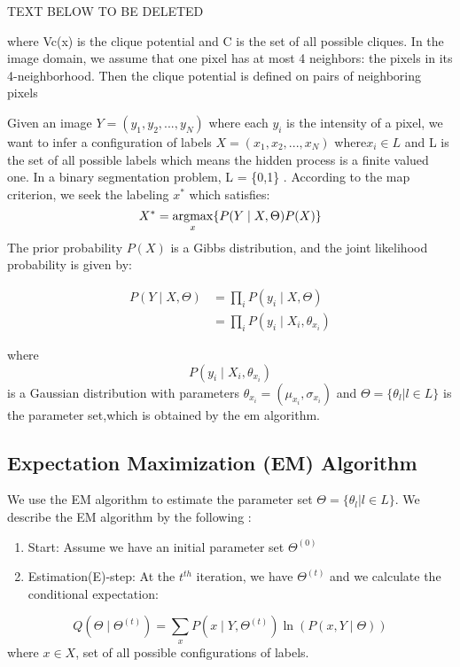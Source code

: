 TEXT BELOW TO BE DELETED

where Vc(x) is the clique potential and C is the set of all possible cliques. In the image domain, we assume that one pixel has at most 4 neighbors: the pixels in its 4-neighborhood. Then the clique potential is defined on pairs of neighboring pixels

Given an image \(Y=(y_1, y_2,..., y_N)\) where each \(y_i\) is the intensity of a pixel, we want to infer a configuration of labels \(X = (x_1,x_2,...,x_N)\) where\(x_i \in L\)  and L is the set of all possible labels which means the hidden process is a finite valued one\cite {monfrini2003image}. In a binary segmentation problem, L = \{0,1\} . According to the \gls{map} criterion, we seek the labeling \(x^*\) which satisfies:
\begin{equation}
X^*=\operatorname*{argmax}_x  \{ P( Y \mid X, \Theta)P(X)\} 
\end{equation}
The prior probability \(P(X)\) is a Gibbs distribution, and the joint likelihood probability is given by:

\begin{equation}\label{eq1}
\begin{split}
P( Y \mid X,\Theta) & =\prod_{i}^{ } P( y_i \mid X,\Theta)\\
& =\prod_{i}^{ }P( y_i \mid X_i,\theta_{x_i})
\end{split}
\end{equation}

where \[P( y_i \mid X_i,\theta_{x_i})\] is a Gaussian distribution with parameters
\(\theta_{x_i}=(\mu_{x_i} , \sigma_{x_i})\) and \(\Theta=\{\theta_l\lvert l \in L\}\)
is the parameter set,which is obtained by the \gls{em} algorithm.

\subsection{Expectation Maximization (EM) Algorithm}
We use the EM algorithm to estimate the parameter set \(\Theta=\{\theta_l\lvert l \in L\}\). We describe the EM algorithm by the following \cite{bordes2007stochastic}:

\begin{enumerate}
	\item Start: Assume we have an initial parameter set \(\Theta^{(0)}\)
	\item  Estimation(E)-step: At the \(t^{th}\) iteration, we have  \(\Theta^{(t)}\) and we calculate the conditional expectation:
\end{enumerate}
\begin{equation}
Q(\Theta \mid \Theta^{(t)}) = {\sum\limits_{x} }P( x \mid Y,\Theta^{(t)})\ln (P( x,Y \mid \Theta))
\end{equation}
where $ x \in X$, set of all possible configurations of labels.

